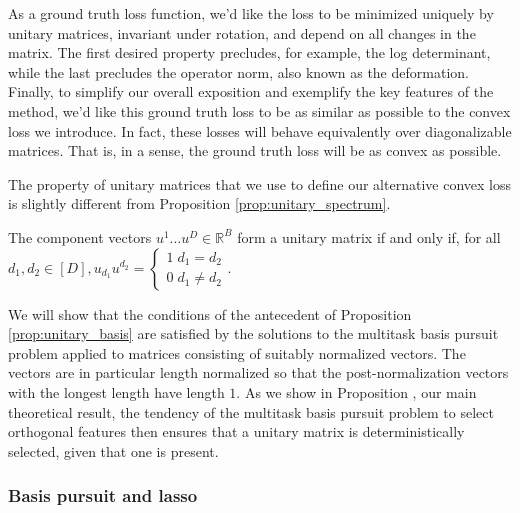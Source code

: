 As a ground truth loss function, we'd like the loss to be minimized uniquely by unitary matrices, invariant under rotation, and depend on all changes in the matrix.
The first desired property precludes, for example, the log determinant, while the last precludes the operator norm, also known as the deformation. %
Finally, to simplify our overall exposition and exemplify the key features of the method, we'd like this ground truth loss to be as similar as possible to the convex loss we introduce.
In fact, these losses will behave equivalently over diagonalizable matrices.
That is, in a sense, the ground truth loss will be as convex as possible.

The property of unitary matrices that we use to define our alternative convex loss is slightly different from Proposition \ref{prop:unitary_spectrum}.
\begin{proposition}
\label{prop:unitary_basis}
The component vectors $u^1 \dots u^D \in \mathbb R^B$ form a unitary matrix if and only if, for all $d_1, d_2 \in [D], u_{d_1} u^{d_2} = \begin{cases}
1 \; d_1 = d_2\\ 
0 \; d_1 \neq d_2 
\end{cases}$.
\end{proposition}

We will show that the conditions of the antecedent of Proposition \ref{prop:unitary_basis} are satisfied by the solutions to the multitask basis pursuit problem applied to matrices consisting of suitably normalized vectors.
The vectors are in particular length normalized so that the post-normalization vectors with the longest length have length $1$.
As we show in Proposition , our main theoretical result,  the tendency of the multitask basis pursuit problem to select orthogonal features then ensures that a unitary matrix is deterministically selected, given that one is present.


\subsubsection{Basis pursuit and lasso}

